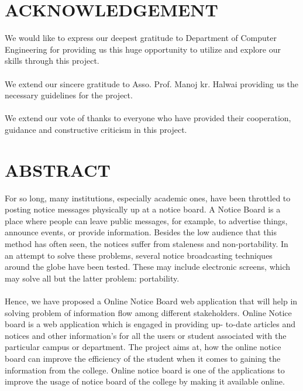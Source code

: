 \documentclass[12pt,a4paper]{article}
\begin{document}
\section*{ACKNOWLEDGEMENT}
We would like to express our deepest gratitude to Department of Computer Engineering for providing us this huge opportunity to utilize and explore our skills through this project.\\ \\
We extend our sincere gratitude to Asso. Prof. Manoj kr. Halwai providing us the necessary guidelines for the project. \\ \\
We extend our vote of thanks to everyone who have provided their cooperation, guidance and constructive criticism in this project.

\cleardoublepage{}

\section*{ABSTRACT}
For so long, many institutions, especially academic ones, have been throttled to posting notice messages physically up at a notice board. A Notice Board is a place where people can leave public messages, for example, to advertise things, announce events, or provide information. Besides the low audience that this method has often seen, the notices suffer from staleness and non-portability. In an attempt to solve these problems, several notice broadcasting techniques around the globe have been tested. These may include electronic screens, which may solve all but the latter problem: portability.\\ \\
Hence, we have proposed a Online Notice Board web application that will help in solving problem of information flow among different stakeholders. Online Notice board is a web application which is engaged in providing up- to-date articles and notices and other information’s for all the users or student associated with the particular campus or department. The project aims at, how the online notice board can improve the efficiency of the student when it comes to gaining the information from the college. Online notice board is one of the applications to improve the usage of notice board of the college by making it available online.


\cleardoublepage{}
\end{document}
